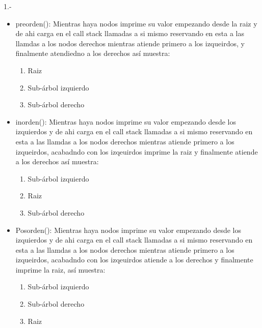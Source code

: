\begin{respuesta}{1.-}
\begin{itemize}
        En el metodo mencionado buscamos eliminar el ultimo nodo que revisa el algoritmo de busqueda así que tomandolo como parametro empezamos a buscar a su padre y en el momento de encontrarlo asignamos al ultimo nodo como null, ahora teniendolo borrado volvemos a eliminar y en elnodo que un principio queriamos borrar sobreescribimos su valor con el del ultimo nodo, dicho valor lo habiamos guardado antes de eliminarMasProfundo. Así que en escencia estos meteodos solo eliminan al ultimo nodo y asignan el valor del ultimo en donde esta el que se quiere borrar.
        \item preorden():
        Mientras haya nodos imprime su valor empezando desde la raiz y de ahi carga en el call stack llamadas a si mismo reservando en esta a las llamdas a los nodos derechos mientras atiende primero a los izqueirdos, y finalmente atendiedno a los derechos así muestra:
        \begin{enumerate}
            \item Raiz
            \item Sub-árbol izquierdo
            \item Sub-árbol derecho
        \end{enumerate}
        \item inorden():
        Mientras haya nodos imprime su valor empezando desde los izquierdos y de ahi carga en el call stack llamadas a si mismo reservando en esta a las llamdas a los nodos derechos mientras atiende primero a los izqueirdos, acabadndo con los izqeuirdos imprime la raiz y finalmente atiende a los derechos así muestra:
        \begin{enumerate}
            \item Sub-árbol izquierdo
            \item Raiz
            \item Sub-árbol derecho
        \end{enumerate}
        \item Posorden():
        Mientras haya nodos imprime su valor empezando desde los izquierdos y de ahi carga en el call stack llamadas a si mismo reservando en esta a las llamdas a los nodos derechos mientras atiende primero a los izqueirdos, acabadndo con los izqeuirdos atiende a los derechos y finalmente imprime la raiz, así muestra:
        \begin{enumerate}
            \item Sub-árbol izquierdo
            \item Sub-árbol derecho
            \item Raiz

\end{enumerate}
\end{itemize}
\end{respuesta}

